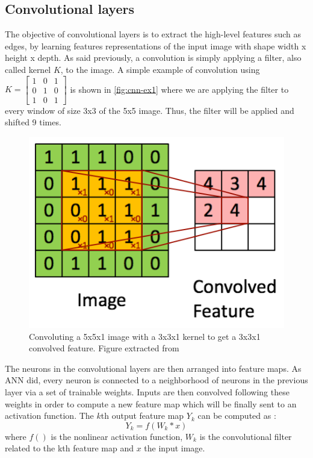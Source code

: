 \documentclass[11pt, openany]{report}
\theoremstyle{plain}
\theoremstyle{definition}
\theoremstyle{remark}
\begin{document}
\subsection{Convolutional layers} \label{sec:conv-layers}
The objective of convolutional layers is to extract the high-level features such as edges, by learning features representations of the input image with shape width x height x depth.  As said previously, a convolution is simply applying a filter, also called kernel $K$, to the image. A simple example of convolution using $K = \begin{bmatrix} 
1 & 0 & 1 \\
0 & 1 & 0 \\
1 & 0 & 1 
\end{bmatrix}$ 
is shown in \autoref{fig:cnn-ex1} where we are applying the filter to every window of size 3x3 of the 5x5 image. Thus, the filter will be applied and shifted 9 times. 

\begin{figure}[h]
  \centering
  \includegraphics[scale=0.55]{figures/cnn-ex1.png}
  \caption{Convoluting a 5x5x1 image with a 3x3x1 kernel to get a 3x3x1 convolved feature. Figure extracted from \cite{CNN-TDS}}
  \label{fig:cnn-ex1}
\end{figure}

\newpage
The neurons in the convolutional layers are then arranged into feature maps. As ANN did, every neuron is connected to a neighborhood of neurons in the previous layer via a set of trainable weights. Inputs are then convolved following these weights in order to compute a new feature map which will be finally sent to an activation function.  
The $k$th output feature map $Y_{k}$ can be computed as \cite{CNN-1}: 
$$ Y_{k} = f(W_{k} * x) $$ 
where $f()$ is the nonlinear activation function, $W_{k}$ is the convolutional filter related to the kth feature map and $x$ the input image. 
\end{document}

